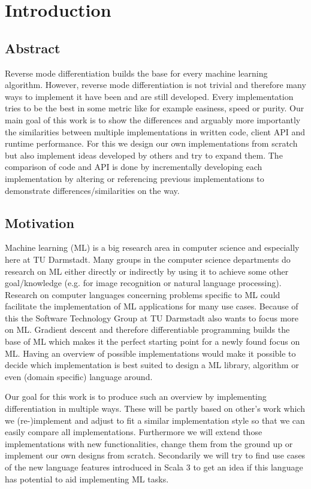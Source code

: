 \chapter{Introduction}

\section{Abstract}
Reverse mode differentiation builds the base for every machine learning algorithm. However, reverse mode differentiation is not trivial and therefore many ways to implement it have been and are still developed. Every implementation tries to be the best in some metric like for example easiness, speed or purity. Our main goal of this work is to show the differences and arguably more importantly the similarities between multiple implementations in written code, client API and runtime performance. For this we design our own implementations from scratch but also implement ideas developed by others and try to expand them. The comparison of code and API is done by incrementally developing each implementation by altering or referencing previous implementations to demonstrate differences/similarities on the way.

\section{Motivation}
Machine learning (ML) is a big research area in computer science and especially here at TU Darmstadt. Many groups in the computer science departments do research on ML either directly or indirectly by using it to achieve some other goal/knowledge (e.g. for image recognition or natural language processing). Research on computer languages concerning problems specific to ML could facilitate the implementation of ML applications for many use cases. Because of this the Software Technology Group at TU Darmstadt also wants to focus more on ML. Gradient descent and therefore differentiable programming builds the base of ML which makes it the perfect starting point for a newly found focus on ML. Having an overview of possible implementations would make it possible to decide which implementation is best suited to design a ML library, algorithm or even (domain specific) language around. 

Our goal for this work is to produce such an overview by implementing differentiation in multiple ways. These will be partly based on other's work which we (re-)implement and adjust to fit a similar implementation style so that we can easily compare all implementations. Furthermore we will extend those implementations with new functionalities, change them from the ground up or implement our own designs from scratch. Secondarily we will try to find use cases of the new language features introduced in Scala 3 to get an idea if this language has potential to aid implementing ML tasks.

